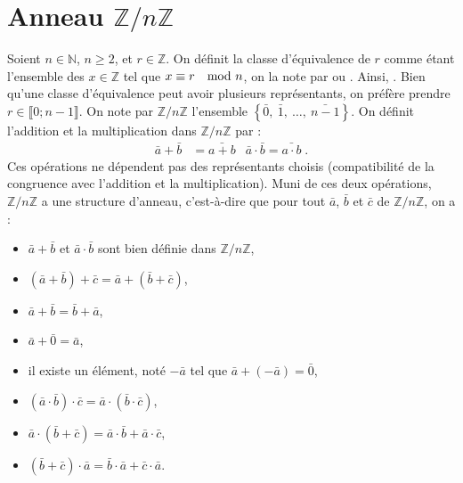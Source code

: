       \section{Anneau $\mathbb{Z}/n\mathbb{Z}$}
      Soient $n\in\mathbb{N}$, $n \geq 2$, et $r\in\mathbb{Z}$.
      On d\'efinit la classe d'\'equivalence de $r$ comme \'etant 
      l'ensemble des $x\in\mathbb{Z}$ tel que $x \equiv r \quad \mathrm{mod}\ n$, 
      on la note par  ou .
      Ainsi,
      .
      Bien qu'une classe d'\'equivalence peut avoir plusieurs repr\'esentants, 
      on pr\'ef\`ere prendre $ r \in \llbracket 0 ; n-1 \rrbracket$.
      On note par $\mathbb{Z}/n\mathbb{Z}$ l'ensemble 
      $\left\lbrace \bar{0},\ \bar{1},\ \ldots ,\ \bar{n-1} \right\rbrace$.
      On d\'efinit l'addition et la multiplication dans $\mathbb{Z}/n\mathbb{Z}$ par :       
      \begin{align*}
            \bar{a} + \bar{b} & = \bar{a+b}       & \bar{a} \cdot \bar{b} = \bar{a\cdot b} \;.
      \end{align*}
      Ces op\'erations ne d\'ependent pas des repr\'esentants choisis (compatibilit\'e de la congruence avec l'addition et la multiplication).
      Muni de ces deux op\'erations, $\mathbb{Z}/n\mathbb{Z}$ a une structure d'anneau,
      c'est-\`a-dire que pour tout $\bar{a}$, $\bar{b}$ et $\bar{c}$ de $\mathbb{Z}/n\mathbb{Z}$, on a :
            \begin{itemize}
                  \item $\bar{a} + \bar{b}$ et $\bar{a} \cdot \bar{b}$ sont bien d\'efinie dans $\mathbb{Z}/n\mathbb{Z}$,
                  \item $(\bar{a} + \bar{b}) + \bar{c} = \bar{a} + (\bar{b} + \bar{c})$,
                  \item $\bar{a} + \bar{b} = \bar{b} + \bar{a}$,
                  \item $\bar{a} + \bar{0} = \bar{a}$,
                  \item il existe un \'el\'ement, not\'e $-\bar{a}$ tel que $\bar{a} + (-\bar{a}) = \bar{0}$,
                  \item $(\bar{a} \cdot \bar{b}) \cdot \bar{c} = \bar{a} \cdot (\bar{b} \cdot \bar{c})$,
                  \item $\bar{a} \cdot (\bar{b} + \bar{c}) = \bar{a} \cdot \bar{b} + \bar{a} \cdot \bar{c}$,
                  \item $(\bar{b} + \bar{c}) \cdot \bar{a} = \bar{b} \cdot \bar{a} + \bar{c} \cdot \bar{a}$.
            \end{itemize}
